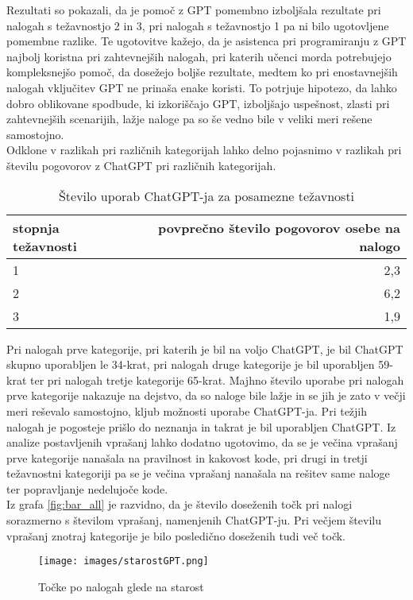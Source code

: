 \documentclass[a4paper,12pt,openright]{book}
\begin{document}
Rezultati so pokazali, da je pomoč z GPT pomembno izboljšala rezultate pri nalogah s težavnostjo 2 in 3, pri nalogah s težavnostjo 1 pa ni bilo ugotovljene pomembne razlike. Te ugotovitve kažejo, da je asistenca pri programiranju z GPT najbolj koristna pri zahtevnejših nalogah, pri katerih učenci morda potrebujejo kompleksnejšo pomoč, da dosežejo boljše rezultate, medtem ko pri enostavnejših nalogah vključitev GPT ne prinaša enake koristi. To potrjuje hipotezo, da lahko dobro oblikovane spodbude, ki izkoriščajo GPT, izboljšajo uspešnost, zlasti pri zahtevnejših scenarijih, lažje naloge pa so še vedno bile v veliki meri rešene samostojno.\\
Odklone v razlikah pri različnih kategorijah lahko delno pojasnimo v razlikah pri številu pogovorov z ChatGPT pri različnih kategorijah.

\begin{table}[h!]
\centering
\begin{tabular}{|l|r|}
\hline
\textbf{stopnja težavnosti} & \textbf{povprečno število pogovorov osebe na nalogo} \\
\hline
1 & 2,3 \\
\hline
2 & 6,2 \\
\hline
3 & 1,9 \\
\hline
\end{tabular}
\caption{Število uporab ChatGPT-ja za posamezne težavnosti}
\label{tab:st-pogovorov}
\end{table}
Pri nalogah prve kategorije, pri katerih je bil na voljo ChatGPT, je bil ChatGPT skupno uporabljen le 34-krat, pri nalogah druge kategorije je bil uporabljen 59-krat ter pri nalogah tretje kategorije 65-krat. Majhno število uporabe pri nalogah prve kategorije nakazuje na dejstvo, da so naloge bile lažje in se jih je zato v večji meri reševalo samostojno, kljub možnosti uporabe ChatGPT-ja. Pri težjih nalogah je pogosteje prišlo do neznanja in takrat je bil uporabljen ChatGPT. Iz analize postavljenih vprašanj lahko dodatno ugotovimo, da se je večina vprašanj prve kategorije nanašala na pravilnost in kakovost kode, pri drugi in tretji težavnostni kategoriji pa se je večina vprašanj nanašala na rešitev same naloge ter popravljanje nedelujoče kode.\\
Iz grafa \ref{fig:bar_all} je razvidno, da je število doseženih točk pri nalogi sorazmerno s številom vprašanj, namenjenih ChatGPT-ju. Pri večjem številu vprašanj znotraj kategorije je bilo posledično doseženih tudi več točk. 

\pagebreak
\begin{figure}[H]
    \centering
    \texttt{[image: images/starostGPT.png]}
    \caption{Točke po nalogah glede na starost}
    \label{fig:starostGPT}
\end{figure}
\end{document}
